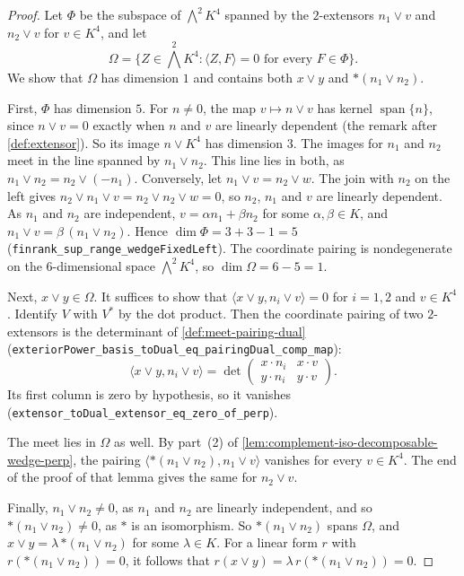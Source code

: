 \begin{proof}
  \leanok
  Let $\Phi$ be the subspace of $\bigwedge^2 K^4$ spanned by the
  $2$-extensors $n_1 \vee v$ and $n_2 \vee v$ for $v \in K^4$, and let
  \[
    \Omega = \{Z \in \textstyle\bigwedge^2 K^4 :
      \langle Z, F \rangle = 0 \text{ for every } F \in \Phi\}.
  \]
  We show that $\Omega$ has dimension $1$ and contains both $x \vee y$
  and $*(n_1 \vee n_2)$.

  First, $\Phi$ has dimension $5$. For $n \neq 0$, the map
  $v \mapsto n \vee v$ has kernel $\operatorname{span}\{n\}$, since
  $n \vee v = 0$ exactly when $n$ and $v$ are linearly dependent (the
  remark after \cref{def:extensor}). So its image $n \vee K^4$ has
  dimension $3$. The images for $n_1$ and $n_2$ meet in the line spanned
  by $n_1 \vee n_2$. This line lies in both, as
  $n_1 \vee n_2 = n_2 \vee (-n_1)$. Conversely, let
  $n_1 \vee v = n_2 \vee w$. The join with $n_2$ on the left gives
  $n_2 \vee n_1 \vee v = n_2 \vee n_2 \vee w = 0$, so $n_2$, $n_1$ and
  $v$ are linearly dependent. As $n_1$ and $n_2$ are independent,
  $v = \alpha n_1 + \beta n_2$ for some $\alpha, \beta \in K$, and
  $n_1 \vee v = \beta\, (n_1 \vee n_2)$. Hence
  $\dim \Phi = 3 + 3 - 1 = 5$
  (\texttt{finrank\_\allowbreak{}sup\_\allowbreak{}range\_\allowbreak{}wedgeFixedLeft}).
  The coordinate pairing is nondegenerate on the $6$-dimensional space
  $\bigwedge^2 K^4$, so $\dim \Omega = 6 - 5 = 1$.

  Next, $x \vee y \in \Omega$. It suffices to show that
  $\langle x \vee y, n_i \vee v \rangle = 0$ for $i = 1, 2$ and
  $v \in K^4$. Identify $V$ with $V^*$ by the dot product. Then the
  coordinate pairing of two $2$-extensors is the determinant of
  \cref{def:meet-pairing-dual}
  (\texttt{exteriorPower\_\allowbreak{}basis\_\allowbreak{}toDual\_\allowbreak{}eq\_\allowbreak{}pairingDual\_\allowbreak{}comp\_\allowbreak{}map}):
  \[
    \langle x \vee y, n_i \vee v \rangle
    = \det \begin{pmatrix} x \cdot n_i & x \cdot v \\
                           y \cdot n_i & y \cdot v \end{pmatrix}.
  \]
  Its first column is zero by hypothesis, so it vanishes
  (\texttt{extensor\_\allowbreak{}toDual\_\allowbreak{}extensor\_\allowbreak{}eq\_\allowbreak{}zero\_\allowbreak{}of\_\allowbreak{}perp}).

  The meet lies in $\Omega$ as well. By part~(2) of
  \cref{lem:complement-iso-decomposable-wedge-perp}, the pairing
  $\langle *(n_1 \vee n_2), n_1 \vee v \rangle$ vanishes for every
  $v \in K^4$. The end of the proof of that lemma gives the same for
  $n_2 \vee v$.

  Finally, $n_1 \vee n_2 \neq 0$, as $n_1$ and $n_2$ are linearly
  independent, and so $*(n_1 \vee n_2) \neq 0$, as $*$ is an isomorphism.
  So $*(n_1 \vee n_2)$ spans $\Omega$, and
  $x \vee y = \lambda\, {*(n_1 \vee n_2)}$ for some $\lambda \in K$. For a
  linear form $r$ with $r(*(n_1 \vee n_2)) = 0$, it follows that
  $r(x \vee y) = \lambda\, r(*(n_1 \vee n_2)) = 0$.
\end{proof}
